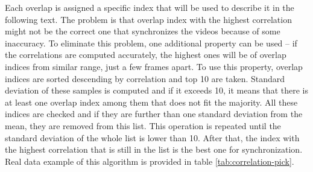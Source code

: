 Each overlap is assigned a specific index that will be used to describe it in the following text. The problem is that overlap index with the highest correlation might not be the correct one that synchronizes the videos because of some inaccuracy. To eliminate this problem, one additional property can be used -- if the correlations are computed accurately, the highest ones will be of overlap indices from similar range, just a few frames apart. To use this property, overlap indices are sorted descending by correlation and top 10 are taken. Standard deviation of these samples is computed and if it exceeds 10, it means that there is at least one overlap index among them that does not fit the majority. All these indices are checked and if they are further than one standard deviation from the mean, they are removed from this list. This operation is repeated until the standard deviation of the whole list is lower than 10. After that, the index with the highest correlation that is still in the list is the best one for synchronization. Real data example of this algorithm is provided in table \ref{tab:correlation-pick}.

